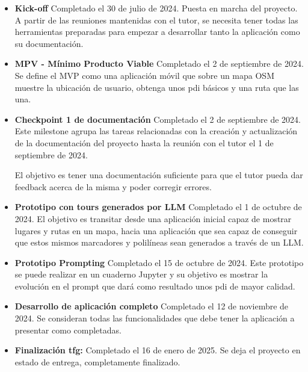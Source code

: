 \begin{itemize}

    \item \textbf{Kick-off} Completado el 30 de julio de 2024. Puesta en marcha del proyecto. A partir de las reuniones mantenidas con el tutor, se necesita tener todas las herramientas preparadas para empezar a desarrollar tanto la aplicación como su documentación.
    
    \item \textbf{MPV - Mínimo Producto Viable} Completado el 2 de septiembre de 2024. Se define el MVP como una aplicación móvil que sobre un mapa OSM muestre la ubicación de usuario, obtenga unos \acrshort{pdi} básicos y una ruta que las una.

    \item \textbf{Checkpoint 1 de documentación} Completado el 2 de septiembre de 2024. Este milestone agrupa las tareas relacionadas con la creación y actualización de la documentación del proyecto hasta la reunión con el tutor el 1 de septiembre de 2024.

    El objetivo es tener una documentación suficiente para que el tutor pueda dar feedback acerca de la misma y poder corregir errores.

    \item \textbf{Prototipo con tours generados por LLM} Completado el 1 de octubre de 2024. El objetivo es transitar desde una aplicación inicial capaz de mostrar lugares y rutas en un mapa, hacia una aplicación que sea capaz de conseguir que estos mismos marcadores y polilíneas sean generados a través de un LLM. \label{hito:prototipo_llm}
    
    \item \textbf{Prototipo Prompting} Completado el 15 de octubre de 2024. Este prototipo se puede realizar en un cuaderno Jupyter y su objetivo es mostrar la evolución en el prompt que dará como resultado unos \acrshort{pdi} de mayor calidad.
    
    \item \textbf{Desarrollo de aplicación completo} Completado el 12 de noviembre de 2024. Se consideran todas las funcionalidades que debe tener la aplicación a presentar como completadas.
    
    \item \textbf{Finalización \acrshort{tfg}:} Completado el 16 de enero de 2025. Se deja el proyecto en estado de entrega, completamente finalizado.
    
\end{itemize}

